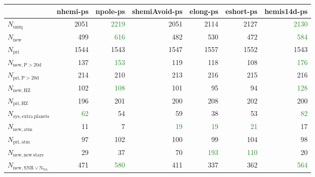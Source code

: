 \begin{tabular}{lrrrrrr}
\toprule
{} &  nhemi-ps &  npole-ps &  shemiAvoid-ps &  elong-ps &  eshort-ps &  hemis14d-ps \\
\midrule
$N_{\mathrm{uniq}}$                &      2051 &      \textcolor{ForestGreen}{2219} &           2051 &      2114 &       2127 &         \textcolor{ForestGreen}{2130} \\
$N_{\mathrm{new}}$                 &       499 &       \textcolor{ForestGreen}{616} &            482 &       530 &        472 &          \textcolor{ForestGreen}{584} \\
$N_{\mathrm{pri}}$                 &      1544 &      1543 &           1547 &      1557 &       1552 &         1543 \\
$N_{\mathrm{new,P>20d}}$           &       137 &       \textcolor{ForestGreen}{153} &            119 &       118 &        108 &          \textcolor{ForestGreen}{176} \\
$N_{\mathrm{pri,P>20d}}$           &       214 &       210 &            213 &       216 &        215 &          216 \\
$N_{\mathrm{new,HZ}}$              &       102 &       \textcolor{ForestGreen}{108} &            101 &        95 &         94 &          \textcolor{ForestGreen}{128} \\
$N_{\mathrm{pri,HZ}}$              &       196 &       201 &            200 &       208 &        202 &          200 \\
$N_{\mathrm{sys,extra\ planets}}$  &        \textcolor{ForestGreen}{62} &        54 &             59 &        38 &         53 &           \textcolor{ForestGreen}{82} \\
$N_{\mathrm{new,atm}}$             &        11 &        7 &             \textcolor{ForestGreen}{19} &       \textcolor{ForestGreen}{19} &        \textcolor{ForestGreen}{21} &          17 \\
$N_{\mathrm{pri,atm}}$             &       97 &       102 &            100 &       99 &        104 &          98 \\
$N_{\mathrm{new,new\ stars}}$      &        29 &        37 &             70 &       \textcolor{ForestGreen}{193} &        \textcolor{ForestGreen}{110} &           20 \\
$N_{\mathrm{new,SNR\lor N_{tra}}}$ &       471 &       \textcolor{ForestGreen}{580} &            411 &       337 &        362 &          \textcolor{ForestGreen}{564} \\
\bottomrule
\end{tabular}
